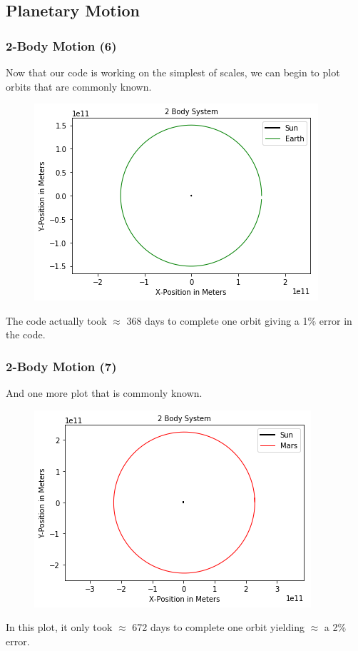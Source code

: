 \documentclass{beamer}
\begin{document}
\subsection{\tiny{Planetary Motion}}
\begin{frame}
\frametitle{2-Body Motion (6)}
Now that our code is working on the simplest of scales, we can begin to plot orbits that are commonly known.
\begin{figure}[htpb]
\begin{center}
\includegraphics[width=0.75\linewidth]{Figures/EarthPlot.png} 
\end{center}
\end{figure}
The code actually took $\approx$ 368 days to complete one orbit giving a 1\% error in the code.
\end{frame}
\begin{frame}
\frametitle{2-Body Motion (7)}
And one more plot that is commonly known.
\begin{figure}[htpb]
\begin{center}
\includegraphics[width=0.75\linewidth]{Figures/MarsPlot.png} 
\end{center}
\end{figure}
In this plot, it only took $\approx$ 672 days to complete one orbit yielding $\approx$ a 2\% error.
\end{frame}
\end{document}
